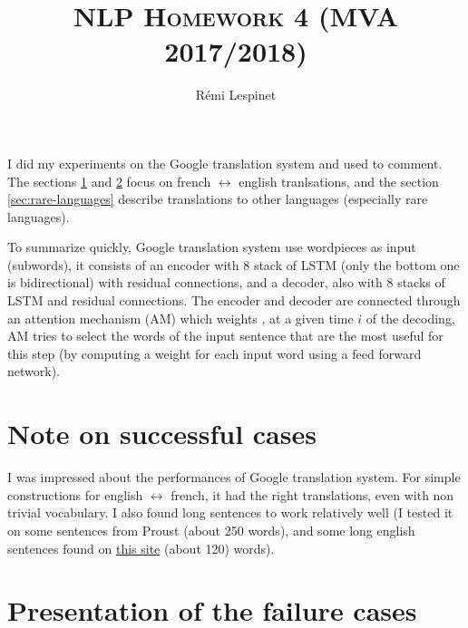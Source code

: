 \documentclass[a4paper, 11pt]{article}
\title{\vspace{-3em}\textsc{NLP Homework 4 (MVA 2017/2018)}\vspace{-4ex}}
\author{Rémi Lespinet\vspace{-2ex}}
\date{}
\begin{document}
\maketitle\vspace{-1em}
\thispagestyle{fancy}

I did my experiments on the Google translation system and used
\cite{wu2016google} to comment. The sections \ref{sec:success} and
\ref{sec:failure} focus on french $\leftrightarrow$ english
tranlsations, and the section \ref{sec:rare-languages} describe
translations to other languages (especially rare languages).

\vspace{-0.3em}

To summarize quickly, Google translation system use wordpieces as
input (subwords), it consists of an encoder with 8 stack of LSTM (only
the bottom one is bidirectional) with residual connections, and a
decoder, also with 8 stacks of LSTM and residual connections. The
encoder and decoder are connected through an attention mechanism (AM)
which weights , at a given time $i$ of the decoding, AM tries to
select the words of the input sentence that are the most useful for
this step (by computing a weight for each input word using a feed
forward network).

\section{Note on successful cases}
\label{sec:success}

I was impressed about the performances of Google translation
system. For simple constructions for english $\leftrightarrow$
french, it had the right translations, even with non trivial
vocabulary.
I also found long sentences to work relatively well (I tested it on
some sentences from Proust (about 250 words), and some long english
sentences found on \href{https://thejohnfox.com/long-sentences/}{this
 site} (about 120) words).

\section{Presentation of the failure cases}
\label{sec:failure}
\end{document}
